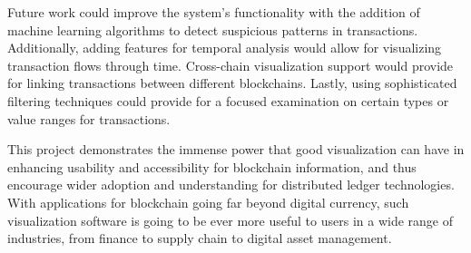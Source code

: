 Future work could improve the system's functionality with the addition of machine learning algorithms to detect suspicious patterns in transactions. Additionally, adding features for temporal analysis would allow for visualizing transaction flows through time. Cross-chain visualization support would provide for linking transactions between different blockchains. Lastly, using sophisticated filtering techniques could provide for a focused examination on certain types or value ranges for transactions.

This project demonstrates the immense power that good visualization can have in enhancing usability and accessibility for blockchain information, and thus encourage wider adoption and understanding for distributed ledger technologies. With applications for blockchain going far beyond digital currency, such visualization software is going to be ever more useful to users in a wide range of industries, from finance to supply chain to digital asset management.